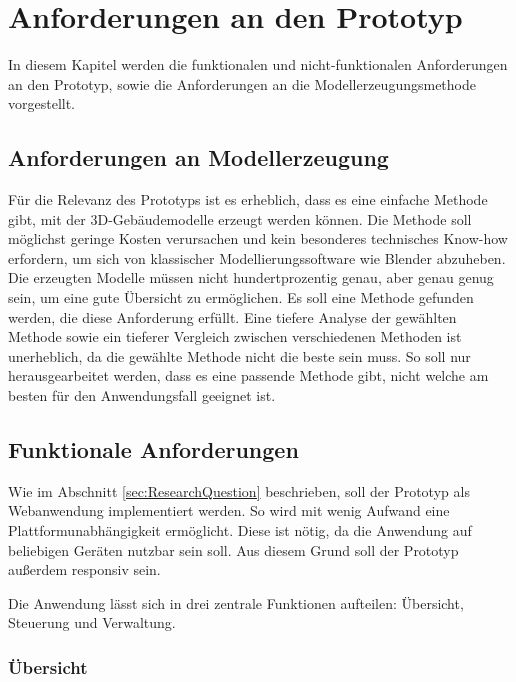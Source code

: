 \newpage
\section{Anforderungen an den Prototyp}\label{sec:Requirements}
In diesem Kapitel werden die funktionalen und nicht-funktionalen Anforderungen an den Prototyp, sowie die Anforderungen an die Modellerzeugungsmethode vorgestellt.

\subsection{Anforderungen an Modellerzeugung}

Für die Relevanz des Prototyps ist es erheblich, dass es eine einfache Methode gibt, mit der 3D-Gebäudemodelle erzeugt werden können. Die Methode soll möglichst geringe Kosten verursachen und kein besonderes technisches Know-how erfordern, um sich von klassischer Modellierungssoftware wie Blender abzuheben. Die erzeugten Modelle müssen nicht hundertprozentig genau, aber genau genug sein, um eine gute Übersicht zu ermöglichen. Es soll eine Methode gefunden werden, die diese Anforderung erfüllt. Eine tiefere Analyse der gewählten Methode sowie ein tieferer Vergleich zwischen verschiedenen Methoden ist unerheblich, da die gewählte Methode nicht die beste sein muss. So soll nur herausgearbeitet werden, dass es eine passende Methode gibt, nicht welche am besten für den Anwendungsfall geeignet ist.

\subsection{Funktionale Anforderungen}\label{sec:FunctionalRequirements}
Wie im Abschnitt \ref{sec:ResearchQuestion} beschrieben, soll der Prototyp als Webanwendung implementiert werden. So wird mit wenig Aufwand eine Plattformunabhängigkeit ermöglicht. Diese ist nötig, da die Anwendung auf beliebigen Geräten nutzbar sein soll. Aus diesem Grund soll der Prototyp außerdem responsiv sein.

Die Anwendung lässt sich in drei zentrale Funktionen aufteilen: Übersicht, Steuerung und Verwaltung.

\subsubsection{Übersicht}

